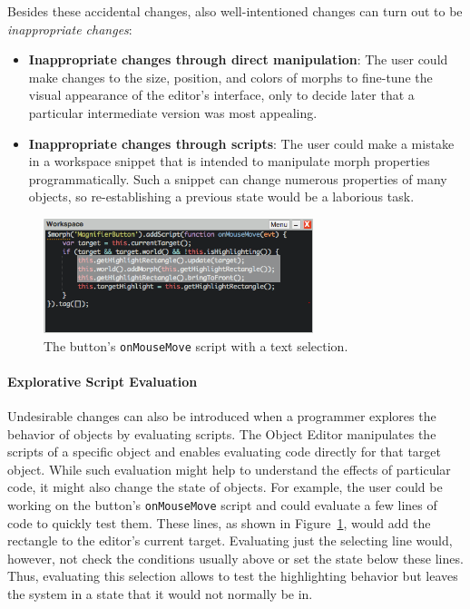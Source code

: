 Besides these accidental changes, also well-intentioned changes can turn out to be \emph{inappropriate changes}:

\begin{itemize}
    \item \textbf{Inappropriate changes through direct manipulation}: The user could make changes to the size, position, and colors of morphs to fine-tune the visual appearance of the editor's interface, only to decide later that a particular intermediate version was most appealing.
    \item \textbf{Inappropriate changes through scripts}: The user could make a mistake in a workspace snippet that is intended to manipulate morph properties programmatically. Such a snippet can change numerous properties of many objects, so re-establishing a previous state would be a laborious task.
\end{itemize}

\begin{figure}[h]
    \centering
    \includegraphics[width=0.7\textwidth]{figures/3_motivation/4_workspaceDoIt.png}
    \caption{The button's \lstinline{onMouseMove} script with a text selection.}
    \label{fig:onMouseOverScript}
\end{figure}

\paragraph{Explorative Script Evaluation}
Undesirable changes can also be introduced when a programmer explores the behavior of objects by evaluating scripts.
The Object Editor manipulates the scripts of a specific object and enables evaluating code directly for that target object.
While such evaluation might help to understand the effects of particular code, it might also change the state of objects.
For example, the user could be working on the button's \lstinline{onMouseMove} script and could evaluate a few lines of code to quickly test them.
These lines, as shown in Figure~\ref{fig:onMouseOverScript}, would add the rectangle to the editor's current target.
Evaluating just the selecting line would, however, not check the conditions usually above or set the state below these lines.
Thus, evaluating this selection allows to test the highlighting behavior but leaves the system in a state that it would not normally be in.

